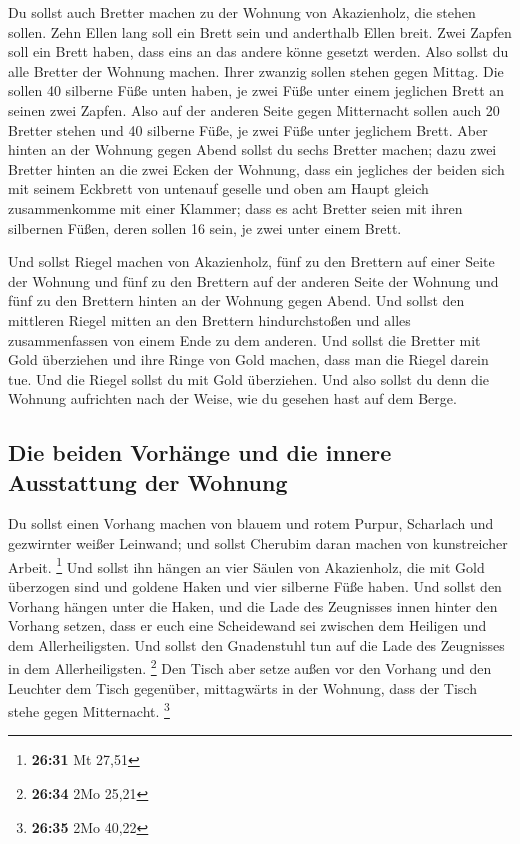  Du sollst auch Bretter machen zu der Wohnung von
Akazienholz, die stehen sollen.  Zehn Ellen lang soll ein
Brett sein und anderthalb Ellen breit.  Zwei Zapfen soll
ein Brett haben, dass eins an das andere könne gesetzt werden. Also
sollst du alle Bretter der Wohnung machen.  Ihrer zwanzig
sollen stehen gegen Mittag.  Die sollen 40 silberne Füße
unten haben, je zwei Füße unter einem jeglichen Brett an seinen zwei
Zapfen.  Also auf der anderen Seite gegen Mitternacht
sollen auch 20 Bretter stehen  und 40 silberne Füße, je
zwei Füße unter jeglichem Brett.  Aber hinten an der
Wohnung gegen Abend sollst du sechs Bretter machen;  dazu
zwei Bretter hinten an die zwei Ecken der Wohnung,  dass
ein jegliches der beiden sich mit seinem Eckbrett von untenauf geselle
und oben am Haupt gleich zusammenkomme mit einer Klammer;
 dass es acht Bretter seien mit ihren silbernen Füßen,
deren sollen 16 sein, je zwei unter einem Brett.

 Und sollst Riegel machen von Akazienholz, fünf zu den
Brettern auf einer Seite der Wohnung  und fünf zu den
Brettern auf der anderen Seite der Wohnung und fünf zu den Brettern
hinten an der Wohnung gegen Abend.  Und sollst den
mittleren Riegel mitten an den Brettern hindurchstoßen und alles
zusammenfassen von einem Ende zu dem anderen.  Und sollst
die Bretter mit Gold überziehen und ihre Ringe von Gold machen, dass man
die Riegel darein tue.  Und die Riegel sollst du mit Gold
überziehen. Und also sollst du denn die Wohnung aufrichten nach der
Weise, wie du gesehen hast auf dem Berge.

\hypertarget{die-beiden-vorhuxe4nge-und-die-innere-ausstattung-der-wohnung}{%
\subsection{Die beiden Vorhänge und die innere Ausstattung der
Wohnung}\label{die-beiden-vorhuxe4nge-und-die-innere-ausstattung-der-wohnung}}

 Du sollst einen Vorhang machen von blauem und rotem
Purpur, Scharlach und gezwirnter weißer Leinwand; und sollst Cherubim
daran machen von kunstreicher Arbeit. \footnote{\textbf{26:31} Mt 27,51}
 Und sollst ihn hängen an vier Säulen von Akazienholz,
die mit Gold überzogen sind und goldene Haken und vier silberne Füße
haben.  Und sollst den Vorhang hängen unter die Haken,
und die Lade des Zeugnisses innen hinter den Vorhang setzen, dass er
euch eine Scheidewand sei zwischen dem Heiligen und dem Allerheiligsten.
 Und sollst den Gnadenstuhl tun auf die Lade des
Zeugnisses in dem Allerheiligsten. \footnote{\textbf{26:34} 2Mo 25,21}
 Den Tisch aber setze außen vor den Vorhang und den
Leuchter dem Tisch gegenüber, mittagwärts in der Wohnung, dass der Tisch
stehe gegen Mitternacht. \footnote{\textbf{26:35} 2Mo 40,22}

